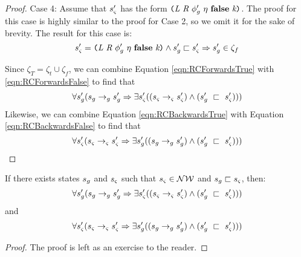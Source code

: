 \begin{proof}
Case 4: Assume that $s_{\varsigma}^\prime$ has the form $\lp \cfgnt{L}\ \cfgnt{R}\ \phi_g^\prime\ \eta\ \cfgt{false}\ \cfgnt{k}\rp $.
The proof for this case is highly similar to the proof for Case 2, so we omit it for the sake of brevity. The result for this case is:
\begin{equation}
\label{eqn:RCBackwardsFalse}
s_\sym^\prime=\lp \cfgnt{L}\ \cfgnt{R}\ \phi_g^\prime\ \eta\ \cfgt{false}\ \cfgnt{k}\rp \wedge s_\gse^\prime \sqsubset s_\sym^\prime \Rightarrow s_\gse^\prime \in \zeta_f
\end{equation}

Since $\zeta_T = \zeta_t \cup \zeta_f$, we can combine Equation \ref{eqn:RCForwardsTrue} with \ref{eqn:RCForwardsFalse} to find that 
\begin{equation}
\forall s_{g}^\prime ( s_{g} \rightarrow_{g} s_{g}^\prime \Rightarrow \exists s_{\varsigma}^\prime( (s_{\varsigma} \rightarrow_{\varsigma} s_{\varsigma}^\prime )\wedge (s_{g}^\prime\ \sqsubset\ s_{\varsigma}^\prime ))  )
\end{equation}
Likewise, we can combine Equation \ref{eqn:RCBackwardsTrue} with Equation \ref{eqn:RCBackwardsFalse} to find that
\begin{equation}
\forall s_{\varsigma}^\prime ( s_{\varsigma} \rightarrow_{\varsigma} s_{\varsigma}^\prime\Rightarrow \exists s_{g}^\prime( (s_{g} \rightarrow_{g} s_{g}^\prime )\wedge (s_{g}^\prime\ \sqsubset\ s_{\varsigma}^\prime ))  )
\end{equation}
\end{proof}

\begin{lemma}
\label{lem:new}
If there exists states $s_{g}$ and $s_{\varsigma}$ such that $s_{\varsigma} \in \mathcal{NW}$ and $s_{g} \sqsubset s_{\varsigma}$, then:
\begin{equation}
\forall s_{g}^\prime ( s_{g} \rightarrow_{g} s_{g}^\prime \Rightarrow \exists s_{\varsigma}^\prime( (s_{\varsigma} \rightarrow_{\varsigma} s_{\varsigma}^\prime )\wedge (s_{g}^\prime\ \sqsubset\ s_{\varsigma}^\prime ))  )
\end{equation}
and
\begin{equation}
\forall s_{\varsigma}^\prime ( s_{\varsigma} \rightarrow_{\varsigma} s_{\varsigma}^\prime\Rightarrow \exists s_{g}^\prime( (s_{g} \rightarrow_{g} s_{g}^\prime )\wedge (s_{g}^\prime\ \sqsubset\ s_{\varsigma}^\prime ))  )
\end{equation}

\begin{proof}
The proof is left as an exercise to the reader.
\end{proof}

\end{lemma}


